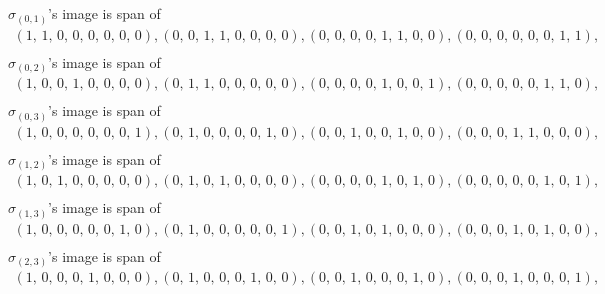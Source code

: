 \documentclass[8pt]{article}\usepackage{amsmath}
\begin{document}
\( \sigma_{(0, 1)}\)'s image is span of   
\begin{align*} \left(1,\,1,\,0,\,0,\,0,\,0,\,0,\,0\right) , \left(0,\,0,\,1,\,1,\,0,\,0,\,0,\,0\right) , \left(0,\,0,\,0,\,0,\,1,\,1,\,0,\,0\right) , \left(0,\,0,\,0,\,0,\,0,\,0,\,1,\,1\right) , \\ \end{align*}
\( \sigma_{(0, 2)}\)'s image is span of   
\begin{align*} \left(1,\,0,\,0,\,1,\,0,\,0,\,0,\,0\right) , \left(0,\,1,\,1,\,0,\,0,\,0,\,0,\,0\right) , \left(0,\,0,\,0,\,0,\,1,\,0,\,0,\,1\right) , \left(0,\,0,\,0,\,0,\,0,\,1,\,1,\,0\right) , \\ \end{align*}
\( \sigma_{(0, 3)}\)'s image is span of   
\begin{align*} \left(1,\,0,\,0,\,0,\,0,\,0,\,0,\,1\right) , \left(0,\,1,\,0,\,0,\,0,\,0,\,1,\,0\right) , \left(0,\,0,\,1,\,0,\,0,\,1,\,0,\,0\right) , \left(0,\,0,\,0,\,1,\,1,\,0,\,0,\,0\right) , \\ \end{align*}
\( \sigma_{(1, 2)}\)'s image is span of   
\begin{align*} \left(1,\,0,\,1,\,0,\,0,\,0,\,0,\,0\right) , \left(0,\,1,\,0,\,1,\,0,\,0,\,0,\,0\right) , \left(0,\,0,\,0,\,0,\,1,\,0,\,1,\,0\right) , \left(0,\,0,\,0,\,0,\,0,\,1,\,0,\,1\right) , \\ \end{align*}
\( \sigma_{(1, 3)}\)'s image is span of   
\begin{align*} \left(1,\,0,\,0,\,0,\,0,\,0,\,1,\,0\right) , \left(0,\,1,\,0,\,0,\,0,\,0,\,0,\,1\right) , \left(0,\,0,\,1,\,0,\,1,\,0,\,0,\,0\right) , \left(0,\,0,\,0,\,1,\,0,\,1,\,0,\,0\right) , \\ \end{align*}
\( \sigma_{(2, 3)}\)'s image is span of   
\begin{align*} \left(1,\,0,\,0,\,0,\,1,\,0,\,0,\,0\right) , \left(0,\,1,\,0,\,0,\,0,\,1,\,0,\,0\right) , \left(0,\,0,\,1,\,0,\,0,\,0,\,1,\,0\right) , \left(0,\,0,\,0,\,1,\,0,\,0,\,0,\,1\right) , \\ \end{align*}
\end{document}
